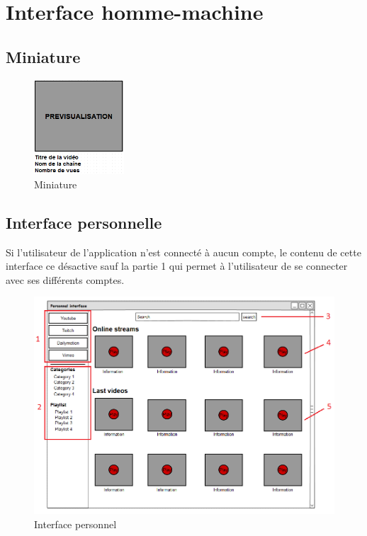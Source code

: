 \documentclass[11pt]{report} %
\begin{document}
			\newpage
	
	\section{Interface homme-machine}
		\subsection{Miniature}
		
		\begin{figure}[h]
			\center
			\includegraphics[width=0.3\textwidth]{../img/Miniature.png}
			\caption{Miniature}
			\label{Miniature}
		\end{figure}
		
		\subsection{Interface personnelle}
		Si l'utilisateur de l'application n'est connecté à aucun compte, le contenu de cette interface ce désactive sauf la partie 1 qui permet à l'utilisateur de se connecter avec ses différents comptes.
		\begin{figure}[h]
			\center
			\includegraphics[width=1\textwidth]{../img/personnalInterfacenum.png}
			\caption{Interface personnel}
			\label{interfacepersonnel}
		\end{figure}
		
\end{document}

